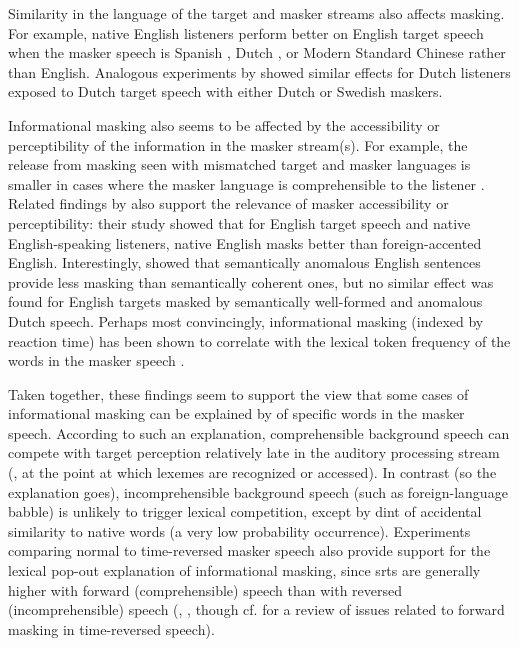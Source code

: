 
Similarity in the language of the target and masker streams also affects masking.  For example, native English listeners perform better on English target speech when the masker speech is Spanish \citep{GarciaLecumberriCooke2006}, Dutch \citep{BrouwerEtAl2012}, or Modern Standard Chinese \citep{VanEngenBradlow2007} rather than English.  Analogous experiments by \citet{RhebergenEtAl2005} showed similar effects for Dutch listeners exposed to Dutch target speech with either Dutch or Swedish maskers.  

Informational masking also seems to be affected by the accessibility or perceptibility of the information in the masker stream(s).  For example, the release from masking seen with mismatched target and masker languages is smaller in cases where the masker language is comprehensible to the listener \citep{VanEngen2010}.  Related findings by \citet{CalandruccioEtAl2010} also support the relevance of masker accessibility or perceptibility: their study showed that for English target speech and native English-speaking listeners, native English masks better than foreign-accented English.\footnotemark{}  Interestingly, \citet{BrouwerEtAl2012} showed that semantically anomalous English sentences provide less masking than semantically coherent ones, but no similar effect was found for English targets masked by semantically well-formed and anomalous Dutch speech.  Perhaps most convincingly, informational masking (indexed by reaction time) has been shown to correlate with the lexical token frequency of the words in the masker speech \citep{BoulengerEtAl2010}.


Taken together, these findings seem to support the view that some cases of informational masking can be explained by  of specific words in the masker speech.  According to such an explanation, comprehensible background speech can compete with target perception relatively late in the auditory processing stream (\ie, at the point at which lexemes are recognized or accessed).  In contrast (so the explanation goes), incomprehensible background speech (such as foreign-language babble) is unlikely to trigger lexical competition, except by dint of accidental similarity to native words (a very low probability occurrence).  Experiments comparing normal to time-reversed masker speech also provide support for the lexical pop-out explanation of informational masking, since \ac{srt}s are generally higher with forward (comprehensible) speech than with reversed (incomprehensible) speech (\eg, \citealt{HoenEtAl2007}, though cf. \citealt{RhebergenEtAl2005} for a review of issues related to forward masking in time-reversed speech).

